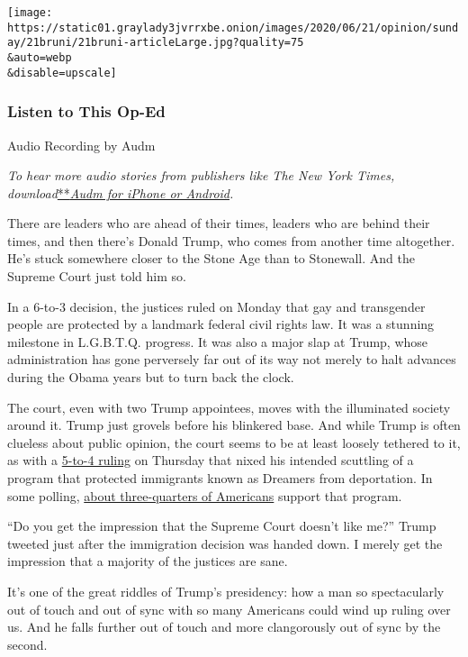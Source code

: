 \texttt{[image: https://static01.graylady3jvrrxbe.onion/images/2020/06/21/opinion/sunday/21bruni/21bruni-articleLarge.jpg?quality=75\\\&auto=webp\\\&disable=upscale]}

\hypertarget{listen-to-this-op-ed}{%
\subsubsection{Listen to This Op-Ed}\label{listen-to-this-op-ed}}

Audio Recording by Audm

\emph{To hear more audio stories from publishers like The New York
Times,
download}\href{https://www.audm.com/?utm_source=nytmag\&utm_medium=embed\&utm_campaign=left_behind_draper}{**}\href{https://www.audm.com/?utm_source=nyto\&utm_medium=embed\&utm_campaign=trump_the_troglodyte}{\emph{Audm
for iPhone or Android}}\emph{.}

There are leaders who are ahead of their times, leaders who are behind
their times, and then there's Donald Trump, who comes from another time
altogether. He's stuck somewhere closer to the Stone Age than to
Stonewall. And the Supreme Court just told him so.

In a 6-to-3 decision, the justices ruled on Monday that gay and
transgender people are protected by a landmark federal civil rights law.
It was a stunning milestone in L.G.B.T.Q. progress. It was also a major
slap at Trump, whose administration has gone perversely far out of its
way not merely to halt advances during the Obama years but to turn back
the clock.

The court, even with two Trump appointees, moves with the illuminated
society around it. Trump just grovels before his blinkered base. And
while Trump is often clueless about public opinion, the court seems to
be at least loosely tethered to it, as with a
\href{https://www.nytimes3xbfgragh.onion/2020/06/18/us/trump-daca-supreme-court.html}{5-to-4
ruling} on Thursday that nixed his intended scuttling of a program that
protected immigrants known as Dreamers from deportation. In some
polling,
\href{https://www.politico.com/f/?id=00000172-bfcc-d721-adff-bffc571e0000}{about
three-quarters of Americans} support that program.

``Do you get the impression that the Supreme Court doesn't like me?''
Trump tweeted just after the immigration decision was handed down. I
merely get the impression that a majority of the justices are sane.

It's one of the great riddles of Trump's presidency: how a man so
spectacularly out of touch and out of sync with so many Americans could
wind up ruling over us. And he falls further out of touch and more
clangorously out of sync by the second.

